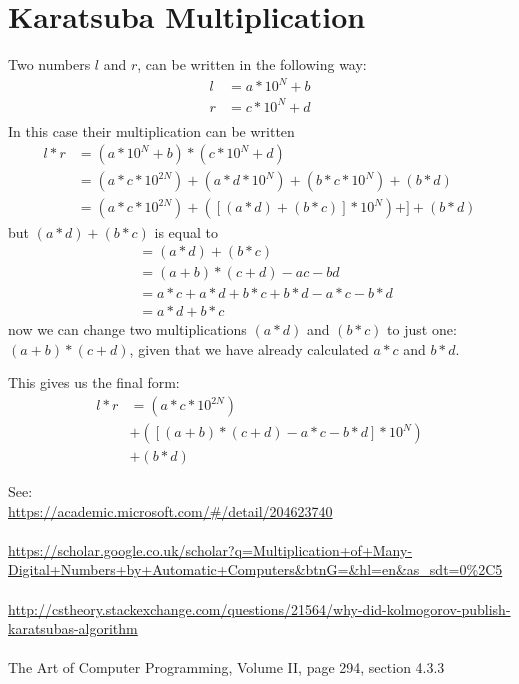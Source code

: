 \documentclass[10pt,a4paper]{article}
\begin{document}
	\section{Karatsuba Multiplication}
	
	Two numbers $l$ and $r$, can be written in the following way:	
	\begin{align*}	
	l &= a*10^N + b\\  
	r &= c*10^N + d\\
	\end{align*}
	In this case their multiplication can be written
	\begin{align*}
	l*r &= (a*10^N + b)*(c*10^N + d)\\ 
	&= (a*c*10^{2N})+(a*d*10^N)+(b*c*10^N)+(b*d)\\  
	&= (a*c*10^{2N})+([(a*d)+(b*c)]*10^N)+]+(b*d)  
	\end{align*}
	but $(a*d)+(b*c)$ is equal to
	\begin{align*}
	&= (a*d)+(b*c)\\
	&= (a+b)*(c+d) - ac - bd\\
	&= a*c + a*d + b*c + b*d - a*c - b*d\\
	&= a*d + b*c
	\end{align*}
	now we can change two multiplications $(a*d)$ and $(b*c)$ to just one: $(a+b)*(c+d)$, given that we have already calculated $a*c$ and $b*d$.  
	
	This gives us the final form:	
	\begin{align*}
	l*r &= (a*c*10^{2N})\\&+([(a+b)*(c+d) - a*c - b*d]*10^N)\\&+(b*d)
	\end{align*}
	
	See:\\
	\url{https://academic.microsoft.com/#/detail/204623740}\\\\
	\url{https://scholar.google.co.uk/scholar?q=Multiplication+of+Many-Digital+Numbers+by+Automatic+Computers&btnG=&hl=en&as_sdt=0%2C5}\\\\
	\url{http://cstheory.stackexchange.com/questions/21564/why-did-kolmogorov-publish-karatsubas-algorithm}\\
	\\
	The Art of Computer Programming, Volume II, page 294, section 4.3.3
\end{document}
